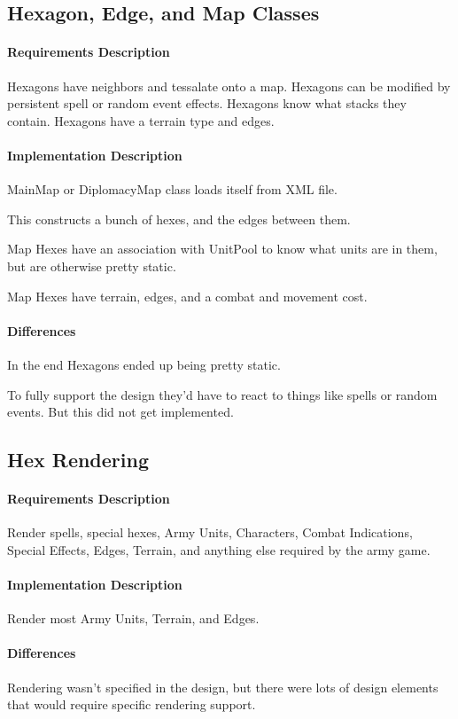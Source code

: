 \documentclass[12pt,a4paper,titlepage]{article}
\begin{document}
\subsection{Hexagon, Edge, and Map Classes} 
\paragraph{Requirements Description}
Hexagons have neighbors and tessalate onto a map.
Hexagons can be modified by persistent spell or
random event effects.
Hexagons know what stacks they contain.
Hexagons have a terrain type and edges.

\paragraph{Implementation Description}
MainMap or DiplomacyMap class loads itself from XML file.

This constructs a bunch of hexes, and the edges between them.

Map Hexes have an association with UnitPool to know what units
are in them, but are otherwise pretty static.

Map Hexes have terrain, edges, and a combat and movement cost.
\paragraph{Differences}
In the end Hexagons ended up being pretty static.

To fully support the design they'd have to
react to things like spells or random events.
But this did not get implemented.

\subsection{Hex Rendering} 
\paragraph{Requirements Description}
Render spells, special hexes, Army Units, Characters, 
Combat Indications, Special Effects, Edges, Terrain, and 
anything else required by the army game.
\paragraph{Implementation Description}
Render most Army Units, Terrain, and Edges.

\paragraph{Differences}
Rendering wasn't specified in the design, but there were lots of 
design elements that would require specific rendering support.
\end{document}
